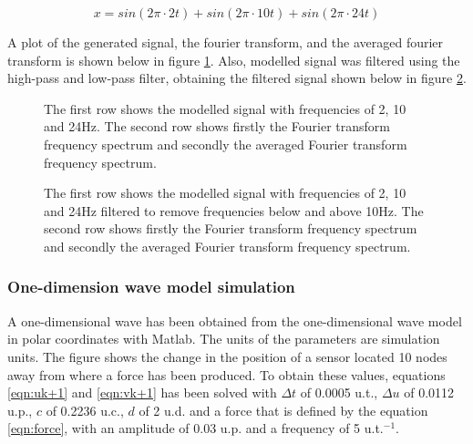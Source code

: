 \documentclass[12pt, a4paper]{article} %
\begin{document}
\setlength{\parskip}{4mm}

\begin{equation} \label{eqn:simulated_signal_preprocess}
	x = sin(2\pi\cdot 2t) + sin(2\pi\cdot 10t) + sin(2\pi\cdot 24t)
\end{equation}

A plot of the generated signal, the fourier transform, and the averaged fourier transform is shown below in figure \ref{fig:noisy_data_simulated}. Also, modelled signal was filtered using the high-pass and low-pass filter, obtaining the filtered signal shown below in figure \ref{fig:noisy_filtered_data_simulated}.

\begin{figure}[htbp]
	\centering
	
	\caption{The first row shows the modelled signal with frequencies of 2, 10 and 24Hz. The second row shows firstly the Fourier transform frequency spectrum and secondly the averaged Fourier transform frequency spectrum.}
	\label{fig:noisy_data_simulated}
\end{figure}


\begin{figure}[htbp]
	\centering
	
	\caption{The first row shows the modelled signal with frequencies of 2, 10 and 24Hz filtered to remove frequencies below and above 10Hz. The second row shows firstly the Fourier transform frequency spectrum and secondly the averaged Fourier transform frequency spectrum.}
	\label{fig:noisy_filtered_data_simulated}
\end{figure}

\setlength{\parskip}{0mm}

\newpage
\subsubsection{One-dimension wave model simulation}

\setlength{\parskip}{0mm}

A one-dimensional wave has been obtained from the one-dimensional wave model in polar coordinates with Matlab. The units of the parameters are simulation units. The figure shows the change in the position of a sensor located 10 nodes away from where a force has been produced.  To obtain these values, equations \ref{eqn:uk+1} and \ref{eqn:vk+1} has been solved with $\Delta t$ of 0.0005 u.t., $\Delta u$ of 0.0112 u.p., $c$ of 0.2236 u.c., $d$ of 2 u.d. and a force that is defined by the equation \ref{eqn:force}, with an amplitude of 0.03 u.p. and a frequency of 5 u.t.$^{-1}$.
\end{document}
